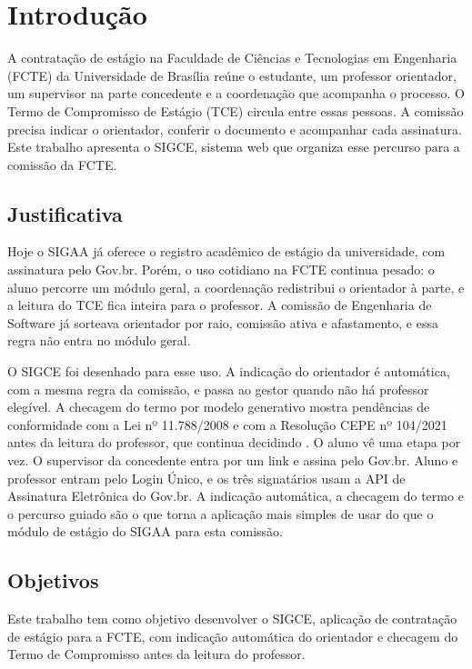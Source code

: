 \chapter[Introdução]{Introdução}

A contratação de estágio na Faculdade de Ciências e Tecnologias em Engenharia (FCTE) da Universidade de Brasília reúne o estudante, um professor orientador, um supervisor na parte concedente e a coordenação que acompanha o processo. O Termo de Compromisso de Estágio (TCE) circula entre essas pessoas. A comissão precisa indicar o orientador, conferir o documento e acompanhar cada assinatura. Este trabalho apresenta o SIGCE, sistema web que organiza esse percurso para a comissão da FCTE.

\section{Justificativa}

Hoje o SIGAA já oferece o registro acadêmico de estágio da universidade, com assinatura pelo Gov.br. Porém, o uso cotidiano na FCTE continua pesado: o aluno percorre um módulo geral, a coordenação redistribui o orientador à parte, e a leitura do TCE fica inteira para o professor. A comissão de Engenharia de Software já sorteava orientador por raio, comissão ativa e afastamento, e essa regra não entra no módulo geral.

O SIGCE foi desenhado para esse uso. A indicação do orientador é automática, com a mesma regra da comissão, e passa ao gestor quando não há professor elegível. A checagem do termo por modelo generativo mostra pendências de conformidade com a Lei nº 11.788/2008 e com a Resolução CEPE nº 104/2021 antes da leitura do professor, que continua decidindo \cite{lei11788,cepe1042021}. O aluno vê uma etapa por vez. O supervisor da concedente entra por um link e assina pelo Gov.br. Aluno e professor entram pelo Login Único, e os três signatários usam a API de Assinatura Eletrônica do Gov.br. A indicação automática, a checagem do termo e o percurso guiado são o que torna a aplicação mais simples de usar do que o módulo de estágio do SIGAA para esta comissão.

\section{Objetivos}

Este trabalho tem como objetivo desenvolver o SIGCE, aplicação de contratação de estágio para a FCTE, com indicação automática do orientador e checagem do Termo de Compromisso antes da leitura do professor.

